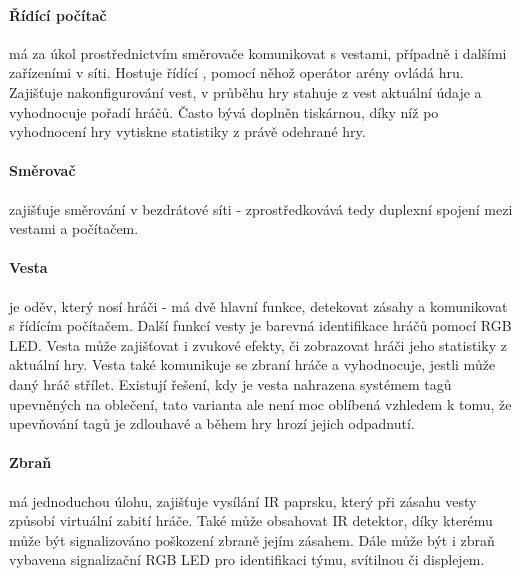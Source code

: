 \paragraph{Řídící počítač}
má za úkol prostřednictvím směrovače komunikovat s vestami, případně i dalšími zařízeními v síti. Hostuje řídící , pomocí něhož operátor arény ovládá hru. Zajišťuje nakonfigurování vest, v průběhu hry stahuje z vest aktuální údaje a vyhodnocuje pořadí hráčů. Často bývá doplněn tiskárnou, díky níž po vyhodnocení hry vytiskne statistiky z právě odehrané hry.

\paragraph{Směrovač}
zajišťuje směrování v bezdrátové síti - zprostředkovává tedy duplexní spojení mezi vestami a počítačem.

\paragraph{Vesta}
je oděv, který nosí hráči - má dvě hlavní funkce, detekovat zásahy a komunikovat s řídícím počítačem. Další funkcí vesty je barevná identifikace hráčů pomocí RGB LED. Vesta může zajišťovat i zvukové efekty, či zobrazovat hráči jeho statistiky z aktuální hry. Vesta také komunikuje se zbraní hráče a vyhodnocuje, jestli může daný hráč střílet. Existují řešení, kdy je vesta nahrazena systémem tagů upevněných na oblečení, tato varianta ale není moc oblíbená vzhledem k tomu, že upevňování tagů je zdlouhavé a během hry hrozí jejich odpadnutí.

\paragraph{Zbraň}
má jednoduchou úlohu, zajišťuje vysílání IR paprsku, který při zásahu vesty způsobí virtuální zabití hráče. Také může obsahovat IR detektor, díky kterému může být signalizováno poškození zbraně jejím zásahem. Dále může být i zbraň vybavena signalizační RGB LED pro identifikaci týmu, svítilnou či displejem.
